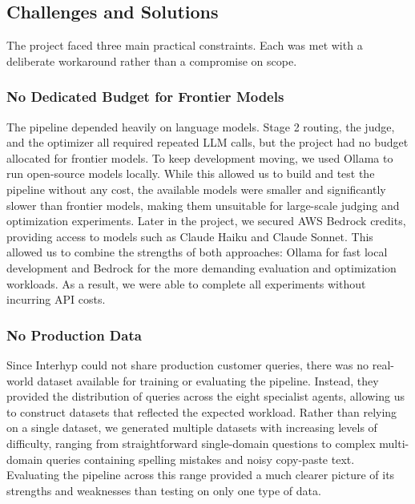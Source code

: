 \label{sec:project-review}

\subsection{Challenges and Solutions}\label{sec:challenges}

The project faced three main practical constraints. Each was met with a deliberate workaround rather than a compromise on scope.

\subsubsection{No Dedicated Budget for Frontier Models}\label{sec:challenge-budget}

The pipeline depended heavily on language models. Stage 2 routing, the judge, and the optimizer all required repeated LLM calls, but the project had no budget allocated for frontier models. To keep development moving, we used Ollama to run open-source models locally. While this allowed us to build and test the pipeline without any cost, the available models were smaller and significantly slower than frontier models, making them unsuitable for large-scale judging and optimization experiments. Later in the project, we secured AWS Bedrock credits, providing access to models such as Claude Haiku and Claude Sonnet. This allowed us to combine the strengths of both approaches: Ollama for fast local development and Bedrock for the more demanding evaluation and optimization workloads. As a result, we were able to complete all experiments without incurring API costs.

\subsubsection{No Production Data}\label{sec:challenge-data}

Since Interhyp could not share production customer queries, there was no real-world dataset available for training or evaluating the pipeline. Instead, they provided the distribution of queries across the eight specialist agents, allowing us to construct datasets that reflected the expected workload. Rather than relying on a single dataset, we generated multiple datasets with increasing levels of difficulty, ranging from straightforward single-domain questions to complex multi-domain queries containing spelling mistakes and noisy copy-paste text. Evaluating the pipeline across this range provided a much clearer picture of its strengths and weaknesses than testing on only one type of data.

